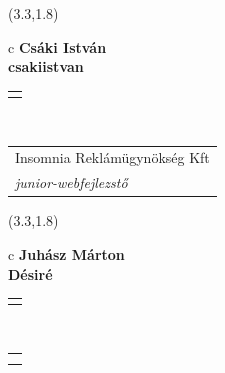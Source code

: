 \documentclass[11pt]{article}
\begin{document}
\makebox(3.3,1.8){
  \renewcommand\arraystretch{1.3}
  \begin{tabular}[c]{c}
    \hspace{8.5mm}
    \LARGE\bf{ Csáki István }\\
    \hspace{8.5mm}
    \Large{ csakiistvan }\\
    \renewcommand\arraystretch{3}
    \begin{tabular}[c]{c}
      \centering
      \fontfamily{phv}\selectfont{
        \textbf{
          \textsc{
            \scriptsize{
            \color{Dark}{ Ismerkedő }\color{Bright}{ Webmester }\color{Bright}{ Sminkmester }\color{Bright}{ Programozó }
            }
          }
        }
      }
    \end{tabular}
    \\
    \renewcommand\arraystretch{1}
    \begin{tabular}{p{3.3in}}
      \hspace{.7cm}Insomnia Reklámügynökség Kft\\
      \hspace{.7cm}\emph{ junior-webfejlezstő }\\
    \end{tabular}
  \end{tabular}
}

\makebox(3.3,1.8){
  \renewcommand\arraystretch{1.3}
  \begin{tabular}[c]{c}
    \hspace{8.5mm}
    \LARGE\bf{ Juhász Márton }\\
    \hspace{8.5mm}
    \Large{ Désiré }\\
    \renewcommand\arraystretch{3}
    \begin{tabular}[c]{c}
      \centering
      \fontfamily{phv}\selectfont{
        \textbf{
          \textsc{
            \scriptsize{
            \color{Bright}{ Ismerkedő }\color{Dark}{ Webmester }\color{Dark}{ Sminkmester }\color{Dark}{ Programozó }
            }
          }
        }
      }
    \end{tabular}
    \\
    \renewcommand\arraystretch{1}
    \begin{tabular}{p{3.3in}}
      \hspace{.7cm}\\
      \hspace{.7cm}\emph{  }\\
    \end{tabular}
  \end{tabular}
}
\end{document}
